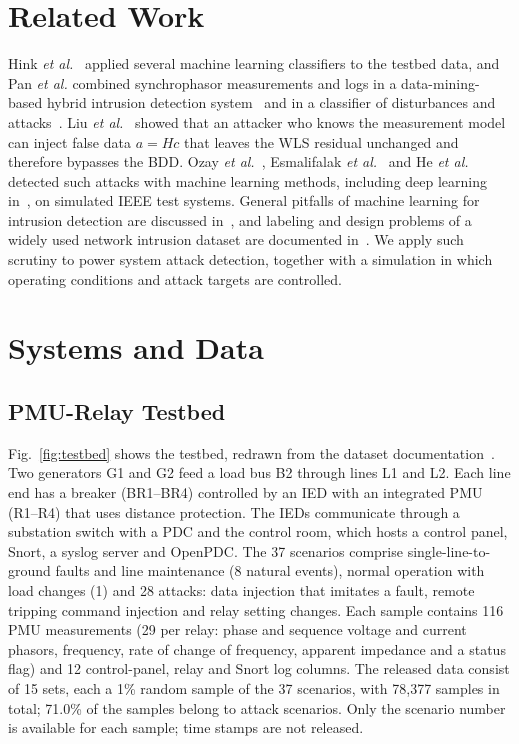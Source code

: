 \documentclass[conference]{IEEEtran}
\begin{document}
\section{Related Work}
Hink \emph{et al.}~\cite{hink2014ml} applied several machine learning classifiers to the testbed data, and Pan \emph{et al.} combined synchrophasor measurements and logs in a data-mining-based hybrid intrusion detection system~\cite{pan2015hybrid} and in a classifier of disturbances and attacks~\cite{pan2015classification}. Liu \emph{et al.}~\cite{liu2011fdi} showed that an attacker who knows the measurement model can inject false data $a=Hc$ that leaves the WLS residual unchanged and therefore bypasses the BDD. Ozay \emph{et al.}~\cite{ozay2016ml}, Esmalifalak \emph{et al.}~\cite{esmalifalak2017stealthy} and He \emph{et al.}~\cite{he2017deep} detected such attacks with machine learning methods, including deep learning in~\cite{he2017deep}, on simulated IEEE test systems. General pitfalls of machine learning for intrusion detection are discussed in~\cite{sommer2010closed,arp2022dos}, and labeling and design problems of a widely used network intrusion dataset are documented in~\cite{engelen2021cicids}. We apply such scrutiny to power system attack detection, together with a simulation in which operating conditions and attack targets are controlled.

\section{Systems and Data}
\subsection{PMU-Relay Testbed}
Fig.~\ref{fig:testbed} shows the testbed, redrawn from the dataset documentation~\cite{morris2014dataset}. Two generators G1 and G2 feed a load bus B2 through lines L1 and L2. Each line end has a breaker (BR1--BR4) controlled by an IED with an integrated PMU (R1--R4) that uses distance protection. The IEDs communicate through a substation switch with a PDC and the control room, which hosts a control panel, Snort, a syslog server and OpenPDC. The 37 scenarios comprise single-line-to-ground faults and line maintenance (8 natural events), normal operation with load changes (1) and 28 attacks: data injection that imitates a fault, remote tripping command injection and relay setting changes. Each sample contains 116 PMU measurements (29 per relay: phase and sequence voltage and current phasors, frequency, rate of change of frequency, apparent impedance and a status flag) and 12 control-panel, relay and Snort log columns. The released data consist of 15 sets, each a 1\% random sample of the 37 scenarios, with 78{,}377 samples in total; 71.0\% of the samples belong to attack scenarios. Only the scenario number is available for each sample; time stamps are not released.
\end{document}
